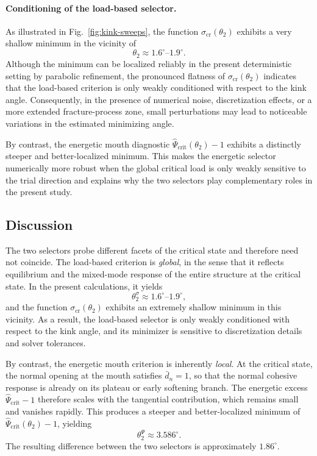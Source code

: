 \documentclass[smallextended]{svjour3}       %
\begin{document}
\paragraph{Conditioning of the load-based selector.}
As illustrated in Fig.~\ref{fig:kink-sweeps}, the function
\(\sigma_{\mathrm{cr}}(\theta_2)\) exhibits a very shallow minimum in the
vicinity of
\[
\theta_2\approx 1.6^\circ\text{--}1.9^\circ.
\]
Although the minimum can be localized reliably in the present deterministic
setting by parabolic refinement, the pronounced flatness of
\(\sigma_{\mathrm{cr}}(\theta_2)\) indicates that the load-based criterion is
only weakly conditioned with respect to the kink angle. Consequently, in the
presence of numerical noise, discretization effects, or a more extended
fracture-process zone, small perturbations may lead to noticeable variations
in the estimated minimizing angle.

By contrast, the energetic mouth diagnostic
\(\hat{\Psi}_{\mathrm{crit}}(\theta_2)-1\) exhibits a distinctly steeper and
better-localized minimum. This makes the energetic selector numerically more
robust when the global critical load is only weakly sensitive to the trial
direction and explains why the two selectors play complementary roles in the
present study.

\subsection{Discussion}

The two selectors probe different facets of the critical state and therefore
need not coincide. The load-based criterion is \emph{global}, in the sense
that it reflects equilibrium and the mixed-mode response of the entire
structure at the critical state. In the present calculations, it yields
\[
\theta_2^{\sigma}\approx 1.6^\circ\text{--}1.9^\circ,
\]
and the function \(\sigma_{\mathrm{cr}}(\theta_2)\) exhibits an extremely
shallow minimum in this vicinity. As a result, the load-based selector is
only weakly conditioned with respect to the kink angle, and its minimizer is
sensitive to discretization details and solver tolerances.

By contrast, the energetic mouth criterion is inherently \emph{local}. At the
critical state, the normal opening at the mouth satisfies \(\bar d_n=1\), so
that the normal cohesive response is already on its plateau or early
softening branch. The energetic excess
\(\hat{\Psi}_{\mathrm{crit}}-1\) therefore scales with the tangential
contribution, which remains small and vanishes rapidly. This produces a
steeper and better-localized minimum of
\(\hat{\Psi}_{\mathrm{crit}}(\theta_2)-1\), yielding
\[
\theta_2^{\Psi}\approx 3.586^\circ.
\]
The resulting difference between the two selectors is approximately
\(1.86^\circ\).
\end{document}
